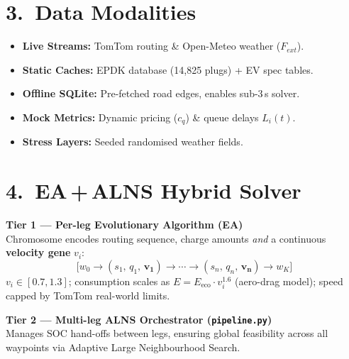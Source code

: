 \documentclass[a0,portrait]{a0poster}
\newenvironment{infobox}[1][PosterGray!60]{%
  \begin{mdframed}[backgroundcolor=#1,linecolor=PosterNavy,linewidth=1.2pt,
    innertopmargin=6pt,innerbottommargin=6pt,
    innerleftmargin=8pt,innerrightmargin=8pt,roundcorner=4pt]
}{%
  \end{mdframed}
}
\begin{document}
\begin{minipage}[t][83cm]{0.31\linewidth}
\section*{3.\ Data Modalities}
\begin{itemize}[leftmargin=1.4em,itemsep=1pt]
  \item \textbf{Live Streams:}    TomTom routing \& Open-Meteo weather ($F_{ext}$).
  \item \textbf{Static Caches:}   EPDK database (14{,}825 plugs) + EV spec tables.
  \item \textbf{Offline SQLite:}  Pre-fetched road edges, enables sub-3\,s solver.
  \item \textbf{Mock Metrics:}    Dynamic pricing ($c_q$) \& queue delays $L_i(t)$.
  \item \textbf{Stress Layers:}   Seeded randomised weather fields.
\end{itemize}

\section*{4.\ EA\,+\,ALNS Hybrid Solver}
\normalsize

\begin{infobox}
\textbf{Tier 1 --- Per-leg Evolutionary Algorithm (EA)}\\[4pt]
Chromosome encodes routing sequence, charge amounts \emph{and} a
continuous \textbf{velocity gene} $v_i$:
\[
  \bigl[w_0 \!\to\! (s_1,\,q_1,\,\mathbf{v_1}) \!\to\! \cdots \!\to\!
        (s_n,\,q_n,\,\mathbf{v_n}) \!\to\! w_K\bigr]
\]
$v_i \!\in\![0.7,1.3]$; consumption scales as
$E = E_\text{eco}\cdot v_i^{1.6}$ (aero-drag model);
speed capped by TomTom real-world limits.
\end{infobox}

\vspace{0.1cm}

\begin{infobox}[PosterBlue!10]
\textbf{Tier 2 --- Multi-leg ALNS Orchestrator (\texttt{pipeline.py})}\\[3pt]
Manages SOC hand-offs between legs, ensuring global feasibility across
all waypoints via Adaptive Large Neighbourhood Search.
\end{infobox}

\vspace{0.8cm}


\end{minipage}
\end{document}
